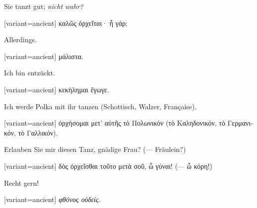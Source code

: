 Sie tanzt gut; \emph{nicht wahr?} 

\switchcolumn

\begin{greek}[variant=ancient]%
καλῶς ὀρχεῖται· ἦ γάρ;

\end{greek}%
\switchcolumn*

Allerdings. 

\switchcolumn

\begin{greek}[variant=ancient]%
μάλιστα.

\end{greek}%
\switchcolumn*

Ich bin ent\textcompwordmark{}zückt.

\switchcolumn

\begin{greek}[variant=ancient]%
κεκήλημαι ἔγωγε.

\end{greek}%
\switchcolumn*

Ich werde Polka mit ihr tanzen (Schottisch, Walzer, Française). 

\switchcolumn

\begin{greek}[variant=ancient]%
ὀρχήσομαι μετ' αὐτῆς τὸ Πολωνικόν (τὸ Καληδονικόν, τὸ Γερμανικόν,
τὸ Γαλλικόν).

\end{greek}%
\switchcolumn*

Erlauben Sie mir diesen Tanz, gnädige Frau? (— Fräulein?) 

\switchcolumn

\begin{greek}[variant=ancient]%
δὸς ὀρχεῖσθαι τοῦτο μετὰ σοῦ, ὦ γύναι! (--- ὦ κόρη!)

\end{greek}%
\switchcolumn*

Recht gern! 

\switchcolumn

\begin{greek}[variant=ancient]%
\emph{φθόνος οὐδείς.}

\end{greek}%
\switchcolumn*

